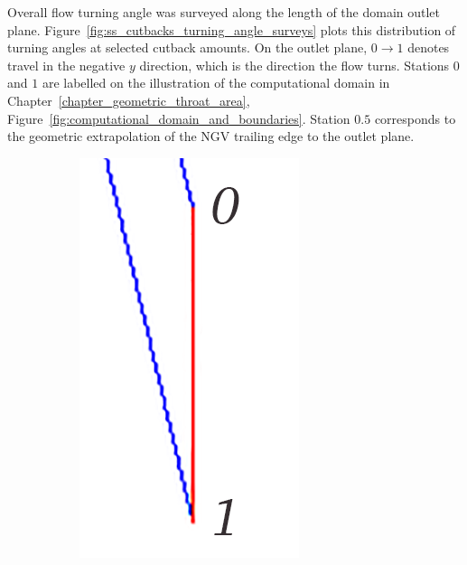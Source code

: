 \documentclass[a4paper, 11pt, oneside]{report}
\begin{document}
Overall flow turning angle was surveyed along the length of the domain outlet plane. Figure~\ref{fig:ss_cutbacks_turning_angle_surveys} plots this distribution of turning angles at selected cutback amounts. On the outlet plane, $0\rightarrow1$ denotes travel in the negative $y$ direction, which is the direction the flow turns. Stations $0$ and $1$ are labelled on the illustration of the computational domain in Chapter~\ref{chapter_geometric_throat_area}, Figure~\ref{fig:computational_domain_and_boundaries}. Station $0.5$ corresponds to the geometric extrapolation of the NGV trailing edge to the outlet plane.

\begin{figure}[H]
	\centering
	\begin{subfigure}{.125\textwidth}
		\centering
		\includegraphics[width=\linewidth]{figs/outlet_minifigure.png}

\end{subfigure}
\end{figure}
\end{document}
